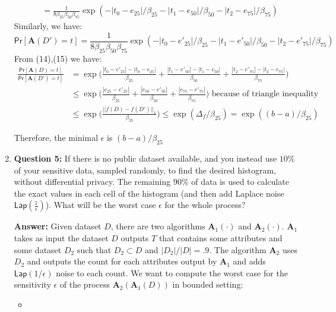 \documentclass{article}
\renewcommand{\AA}{\mathbf{A}}
\renewcommand{\Pr}[1]{\ensuremath{\mathsf{Pr}\left[#1\right]}\xspace}
\newcommand{\ans}[1]{\begin{mdframed}\textbf{Answer: }#1\end{mdframed}}
\begin{document}
\begin{enumerate}
{\begin{itemize}
\begin{equation}
\begin{split}
					\\&= \frac{1}{8\beta_{25}\beta_{50}\beta_{75}}\exp(-|t_0-e_{25}|/\beta_{25} - |t_1-e_{50}|/\beta_{50} - |t_2-e_{75}|/\beta_{75})
				\end{split}
			\end{equation}
			Similarly, we have:
			\begin{equation}
				\Pr{\AA(D') = t} = \frac{1}{8\beta_{25}\beta_{50}\beta_{75}}\exp(-|t_0-e'_{25}|/\beta_{25} - |t_1-e'_{50}|/\beta_{50} - |t_2-e'_{75}|/\beta_{75})
			\end{equation}
			From (14),(15) we have: 
			\begin{equation*}
			\begin{split}
			\frac{\Pr{\AA(D) = t}}{\Pr{\AA(D') = t}} &= \exp\bigg(\frac{|t_0-e'_{25}|-|t_0-e_{25}|}{\beta_{25}} + \frac{|t_1-e'_{50}|-|t_1-e_{50}|}{\beta_{50}}+\frac{|t_2-e'_{75}|-|t_2-e_{75}|}{\beta_{75}}\bigg)
				\\&\leq \exp\bigg(\frac{|e_{25}-e'_{25}|}{\beta_{25}} + \frac{|e_{50}-e'_{50}|}{\beta_{50}} +\frac{|e_{75}-e'_{75}|}{\beta_{75}}\bigg) \text{ because of triangle inequality}
				\\&\leq \exp\bigg(\frac{||f(D)-f(D')||_1}{\beta_{25}}\bigg) \leq \exp(\Delta_f/\beta_{25}) =\exp((b-a)/\beta_{25})
			\end{split}
			\end{equation*}
		\end{itemize}
		Therefore, the minimal $\epsilon$ is $(b-a)/\beta_{25}$
	}
	\item []\textbf{Question 5:} If there is no public dataset available, and you instead use $10\%$ of your sensitive data, sampled randomly, to find the desired histogram, without differential privacy.  The remaining $90\%$ of data is used to calculate the exact values in each cell of the histogram (and then add Laplace noise $\mathsf{Lap}\left(\frac{1}{\epsilon}\right)$).  What will be the worst case  $\epsilon$ for the whole process? 
	\ans{
		Given dataset $D$, there are two algorithms $\AA_1(\cdot)$ and $\AA_2(\cdot)$. $\AA_1$ takes as input the dataset $D$ outputs $T$ that contains some attributes and some dataset $D_2$ such that $D_2\subset D$ and $|D_2|/|D|=.9$. The algorithm $\AA_2$ uses $D_2$ and outputs the count for each attributes output by $\AA_1$ and adds $\mathsf{Lap}(1/\epsilon)$ noise to each count.  We want to compute the worst case for the sensitivity $\epsilon$ of the process $\AA_2(\AA_1(D))$ in bounded setting:
		\begin{itemize}
			\item 

\end{itemize}}
\end{enumerate}
\end{document}
